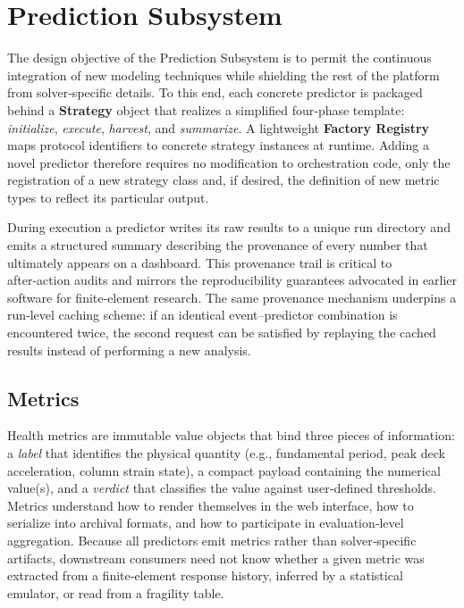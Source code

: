 \section{Prediction Subsystem}\label{sec:scheduling}

The design objective of the Prediction Subsystem is to permit the
continuous integration of new modeling techniques while shielding the
rest of the platform from solver‑specific details. 
To this end, each
concrete predictor is packaged behind a \textbf{Strategy} object \citep{gamma2011design} that
realizes a simplified four‑phase template: \emph{initialize},
\emph{execute}, \emph{harvest}, and \emph{summarize}. 
A lightweight
\textbf{Factory Registry} maps protocol identifiers to concrete strategy
instances at runtime. 
Adding a novel predictor therefore requires no modification to orchestration code, only the registration of a new
strategy class and, if desired, the definition of new metric types to
reflect its particular output.

During execution a predictor writes its raw results to a unique run
directory and emits a structured summary describing the provenance of
every number that ultimately appears on a dashboard. This provenance
trail is critical to after‑action audits and mirrors the reproducibility
guarantees advocated in earlier software for finite‑element research.
The same provenance mechanism underpins a run‑level caching scheme: if
an identical event--predictor combination is encountered twice, the
second request can be satisfied by replaying the cached results instead
of performing a new analysis.

\subsection{Metrics}\label{metrics}

Health metrics are immutable value objects \citep{fowler2013patterns} that bind three pieces of information: a \emph{label} that identifies the physical
quantity (e.g., fundamental period, peak deck acceleration, column
strain state), a compact payload containing the numerical
value(s), and a \emph{verdict} that classifies the value against user‑defined thresholds.
Metrics understand how to render themselves in the web interface, how to serialize into archival formats, and how to participate in evaluation‑level aggregation. 
Because all predictors emit metrics rather than solver‑specific artifacts, downstream consumers need not know whether a given metric was extracted from a finite‑element response history,
inferred by a statistical emulator, or read from a fragility table.

